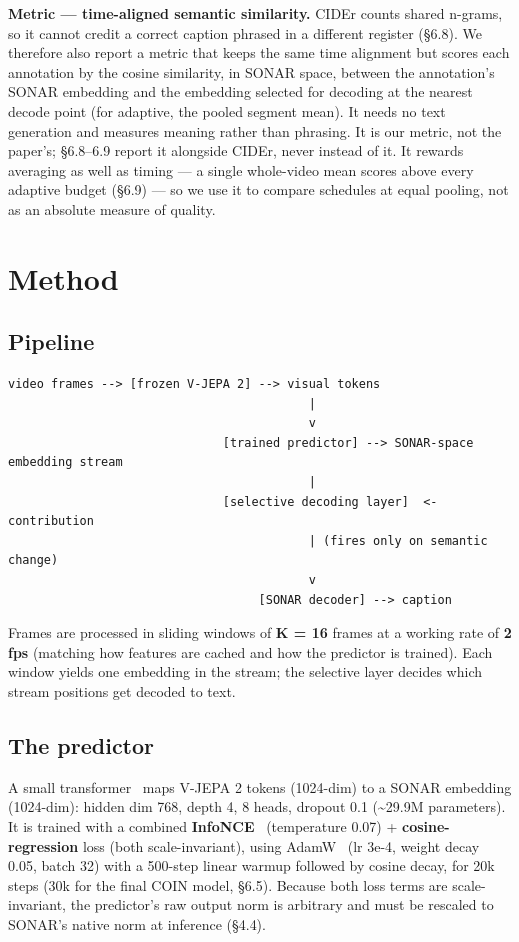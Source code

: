 \textbf{Metric --- time-aligned semantic similarity.} CIDEr counts shared n-grams, so it cannot credit a correct caption phrased in a different register (\S6.8). We therefore also report a metric that keeps the same time alignment but scores each annotation by the cosine similarity, in SONAR space, between the annotation's SONAR embedding and the embedding selected for decoding at the nearest decode point (for adaptive, the pooled segment mean). It needs no text generation and measures meaning rather than phrasing. It is our metric, not the paper's; \S6.8--6.9 report it alongside CIDEr, never instead of it. It rewards averaging as well as timing --- a single whole-video mean scores above every adaptive budget (\S6.9) --- so we use it to compare schedules at equal pooling, not as an absolute measure of quality.

\medskip

\section{Method}

\subsection{Pipeline}

\begin{lstlisting}
video frames --> [frozen V-JEPA 2] --> visual tokens
                                          |
                                          v
                              [trained predictor] --> SONAR-space embedding stream
                                          |
                              [selective decoding layer]  <- contribution
                                          | (fires only on semantic change)
                                          v
                                   [SONAR decoder] --> caption
\end{lstlisting}

Frames are processed in sliding windows of \textbf{K = 16} frames at a working rate of \textbf{2 fps} (matching how features are cached and how the predictor is trained). Each window yields one embedding in the stream; the selective layer decides which stream positions get decoded to text.

\subsection{The predictor}

A small transformer~\cite{transformer2017} maps V-JEPA 2 tokens (1024-dim) to a SONAR embedding (1024-dim): hidden dim 768, depth 4, 8 heads, dropout 0.1 (\textasciitilde{}29.9M parameters). It is trained with a combined \textbf{InfoNCE}~\cite{cpc2018} (temperature 0.07) + \textbf{cosine-regression} loss (both scale-invariant), using AdamW~\cite{adamw2019} (lr 3e-4, weight decay 0.05, batch 32) with a 500-step linear warmup followed by cosine decay, for 20k steps (30k for the final COIN model, \S6.5). Because both loss terms are scale-invariant, the predictor's raw output norm is arbitrary and must be rescaled to SONAR's native norm at inference (\S4.4).

